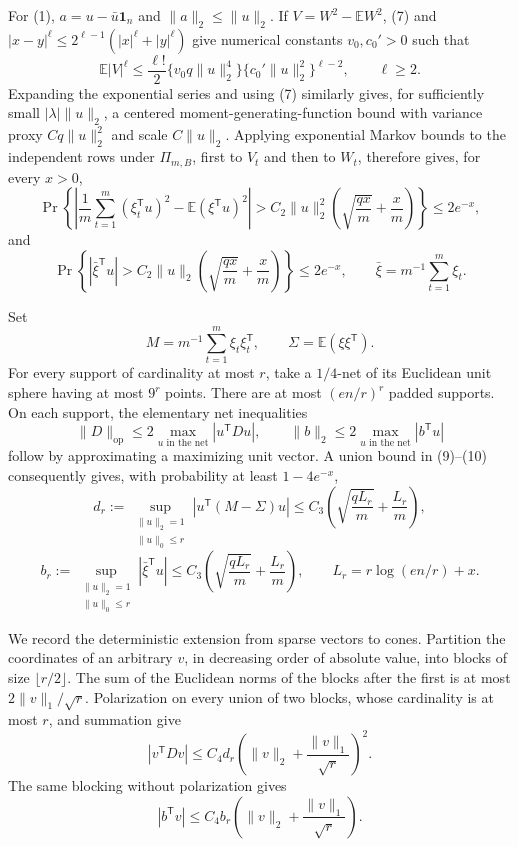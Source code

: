 For (1), \(a=u-\bar u\mathbf 1_n\) and \(\lVert a\rVert_2\le\lVert u\rVert_2\).  If \(V=W^2-\mathbb EW^2\), (7) and \(|x-y|^\ell\le2^{\ell-1}(|x|^\ell+|y|^\ell)\) give numerical constants \(v_0,c_0'>0\) such that
\[
 \mathbb E|V|^\ell
 \le\frac{\ell!}{2}
      \{v_0q\lVert u\rVert_2^4\}
      \{c_0'\lVert u\rVert_2^2\}^{\ell-2},
 \qquad \ell\ge2.
 \tag{8}
\]
Expanding the exponential series and using (7) similarly gives, for sufficiently small \(|\lambda|\lVert u\rVert_2\), a centered moment-generating-function bound with variance proxy \(Cq\lVert u\rVert_2^2\) and scale \(C\lVert u\rVert_2\).  Applying exponential Markov bounds to the independent rows under \(\Pi_{m,B}\), first to \(V_t\) and then to \(W_t\), therefore gives, for every \(x>0\),
\[
 \Pr\!\left\{
  \left|\frac1m\sum_{t=1}^m(\xi_t^{\mathsf T}u)^2
        -\mathbb E(\xi^{\mathsf T}u)^2\right|
  >C_2\lVert u\rVert_2^2
       \left(\sqrt{\frac{qx}{m}}+\frac{x}{m}\right)
 \right\}\le2e^{-x},
 \tag{9}
\]
and
\[
 \Pr\!\left\{
  |\bar\xi^{\mathsf T}u|>
  C_2\lVert u\rVert_2
       \left(\sqrt{\frac{qx}{m}}+\frac{x}{m}\right)
 \right\}\le2e^{-x},
 \qquad \bar\xi=m^{-1}\sum_{t=1}^m\xi_t.
 \tag{10}
\]

Set
\[
 M=m^{-1}\sum_{t=1}^m\xi_t\xi_t^{\mathsf T},
 \qquad \Sigma=\mathbb E(\xi\xi^{\mathsf T}).
\]
For every support of cardinality at most \(r\), take a \(1/4\)-net of its Euclidean unit sphere having at most \(9^r\) points.  There are at most \((en/r)^r\) padded supports.  On each support, the elementary net inequalities
\[
 \lVert D\rVert_{\mathrm{op}}
 \le2\max_{u\text{ in the net}}|u^{\mathsf T}Du|,
 \qquad
 \lVert b\rVert_2
 \le2\max_{u\text{ in the net}}|b^{\mathsf T}u|
 \tag{11}
\]
follow by approximating a maximizing unit vector.  A union bound in (9)--(10) consequently gives, with probability at least \(1-4e^{-x}\),
\[
 d_r:=\sup_{\substack{\lVert u\rVert_2=1\\\lVert u\rVert_0\le r}}
 |u^{\mathsf T}(M-\Sigma)u|
 \le C_3\left(\sqrt{\frac{qL_r}{m}}+\frac{L_r}{m}\right),
 \tag{12}
\]
\[
 b_r:=\sup_{\substack{\lVert u\rVert_2=1\\\lVert u\rVert_0\le r}}
 |\bar\xi^{\mathsf T}u|
 \le C_3\left(\sqrt{\frac{qL_r}{m}}+\frac{L_r}{m}\right),
 \qquad L_r=r\log(en/r)+x.
 \tag{13}
\]

We record the deterministic extension from sparse vectors to cones.  Partition the coordinates of an arbitrary \(v\), in decreasing order of absolute value, into blocks of size \(\lfloor r/2\rfloor\).  The sum of the Euclidean norms of the blocks after the first is at most \(2\lVert v\rVert_1/\sqrt r\).  Polarization on every union of two blocks, whose cardinality is at most \(r\), and summation give
\[
 |v^{\mathsf T}Dv|
 \le C_4d_r\left(\lVert v\rVert_2+\frac{\lVert v\rVert_1}{\sqrt r}\right)^2.
 \tag{14}
\]
The same blocking without polarization gives
\[
 |b^{\mathsf T}v|
 \le C_4b_r\left(\lVert v\rVert_2+\frac{\lVert v\rVert_1}{\sqrt r}\right).
 \tag{15}
\]

